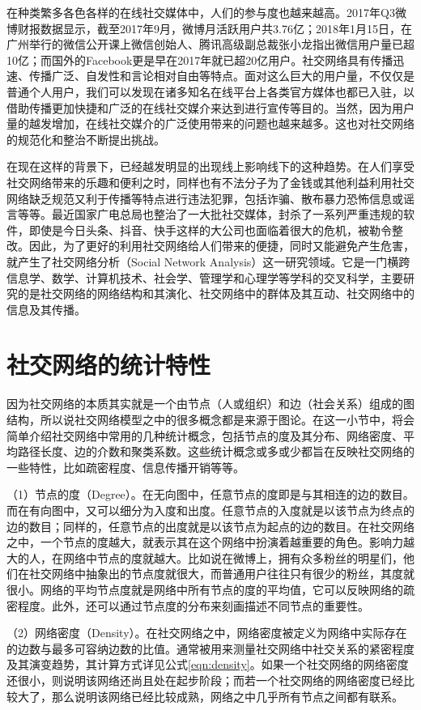 在种类繁多各色各样的在线社交媒体中，人们的参与度也越来越高。2017年Q3微博财报数据显示，截至2017年9月，微博月活跃用户共3.76亿；2018年1月15日，在广州举行的微信公开课上微信创始人、腾讯高级副总裁张小龙指出微信用户量已超10亿；而国外的Facebook更是早在2017年就已超20亿用户。社交网络具有传播迅速、传播广泛、自发性和言论相对自由等特点。面对这么巨大的用户量，不仅仅是普通个人用户，我们可以发现在诸多知名在线平台上各类官方媒体也都已入驻，以借助传播更加快捷和广泛的在线社交媒介来达到进行宣传等目的。当然，因为用户量的越发增加，在线社交媒介的广泛使用带来的问题也越来越多。这也对社交网络的规范化和整治不断提出挑战。

在现在这样的背景下，已经越发明显的出现线上影响线下的这种趋势。在人们享受社交网络带来的乐趣和便利之时，同样也有不法分子为了金钱或其他利益利用社交网络缺乏规范又利于传播等特点进行违法犯罪，包括诈骗、散布暴力恐怖信息或谣言等等。最近国家广电总局也整治了一大批社交媒体，封杀了一系列严重违规的软件，即使是今日头条、抖音、快手这样的大公司也面临着很大的危机，被勒令整改。因此，为了更好的利用社交网络给人们带来的便捷，同时又能避免产生危害，就产生了社交网络分析（Social Network Analysis）这一研究领域。它是一门横跨信息学、数学、计算机技术、社会学、管理学和心理学等学科的交叉科学，主要研究的是社交网络的网络结构和其演化、社交网络中的群体及其互动、社交网络中的信息及其传播。

\section{社交网络的统计特性}

因为社交网络的本质其实就是一个由节点（人或组织）和边（社会关系）组成的图结构，所以说社交网络模型之中的很多概念都是来源于图论。在这一小节中，将会简单介绍社交网络中常用的几种统计概念，包括节点的度及其分布、网络密度、平均路径长度、边的介数和聚类系数。这些统计概念或多或少都旨在反映社交网络的一些特性，比如疏密程度、信息传播开销等等。

（1）节点的度（Degree）。在无向图中，任意节点的度即是与其相连的边的数目。而在有向图中，又可以细分为入度和出度。任意节点的入度就是以该节点为终点的边的数目；同样的，任意节点的出度就是以该节点为起点的边的数目。在社交网络之中，一个节点的度越大，就表示其在这个网络中扮演着越重要的角色。影响力越大的人，在网络中节点的度就越大。比如说在微博上，拥有众多粉丝的明星们，他们在社交网络中抽象出的节点度就很大，而普通用户往往只有很少的粉丝，其度就很小。网络的平均节点度就是网络中所有节点的度的平均值，它可以反映网络的疏密程度。此外，还可以通过节点度的分布来刻画描述不同节点的重要性。

（2）网络密度（Density）。在社交网络之中，网络密度被定义为网络中实际存在的边数与最多可容纳边数的比值。通常被用来测量社交网络中社交关系的紧密程度及其演变趋势，其计算方式详见公式\ref{eqn:density}。如果一个社交网络的网络密度还很小，则说明该网络还尚且处在起步阶段；而若一个社交网络的网络密度已经比较大了，那么说明该网络已经比较成熟，网络之中几乎所有节点之间都有联系。

